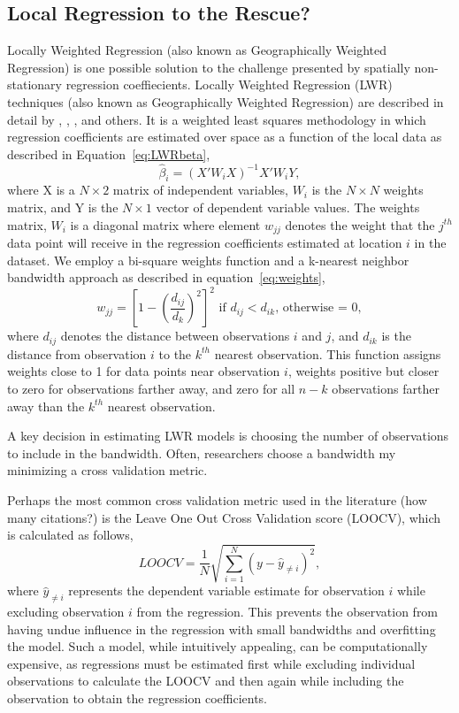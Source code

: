 \documentclass{article}\usepackage[]{graphicx}\usepackage[]{color}
\begin{document}
\subsection{Local Regression to the Rescue?}
Locally Weighted Regression (also known as Geographically Weighted Regression) is one possible solution to the challenge presented by spatially non-stationary regression coeffiecients. Locally Weighted Regression (LWR) techniques (also known as Geographically Weighted Regression) are described in detail by \citet{Cleveland1988}, \citet{Brunsdon1998b}, \citet{Fotheringham2002}, and others. It is a weighted least squares methodology in which regression coefficients are estimated over space as a function of the local data as described in Equation~\eqref{eq:LWRbeta},
\begin{equation}\label{eq:LWRbeta}
\hat{\beta}_i = (X'W_iX)^{-1}X'W_iY,
\end{equation}
where X is a $N \times 2$ matrix of independent variables, $W_i$ is the $N \times N$ weights matrix, and Y is the $N \times 1$ vector of dependent variable values. The weights matrix, $W_i$ is a diagonal matrix where element $w_{jj}$ denotes the weight that the $j^{th}$ data point will receive in the regression coefficients estimated at location $i$ in the dataset. We employ a bi-square weights function and a k-nearest neighbor bandwidth approach as described in equation~\eqref{eq:weights}, 
\begin{equation}\label{eq:weights}
w_{jj}=\left[1-\left(\frac{d_{ij}}{d_{k}}\right)^2 \right]^2 \textrm{ if  }d_{ij}<d_{ik}\textrm{, otherwise = 0},
\end{equation}
where $d_{ij}$ denotes the distance between observations $i$ and $j$, and $d_{ik}$ is the distance from observation $i$ to the $k^{th}$ nearest observation. This function assigns weights close to 1 for data points near observation $i$, weights positive but closer to zero for observations farther away, and zero for all $n-k$ observations farther away than the $k^{th}$ nearest observation. 

A key decision in estimating LWR models is choosing the number of observations to include in the bandwidth. Often, researchers choose a bandwidth my minimizing a cross validation metric. 

Perhaps the most common cross validation metric used in the literature (how many citations?) is the Leave One Out Cross Validation score (LOOCV), which is calculated as follows,
\begin{equation}\label{eq:LOOCV}
LOOCV = \frac{1}{N} \sqrt{\sum _{i = 1}^{N} (y - \hat{y}_{\neq i})^2},  
\end{equation}
where $\hat{y}_{\neq i}$ represents the dependent variable estimate for observation $i$ while excluding observation $i$ from the regression. This prevents the observation from having undue influence in the regression with small bandwidths and overfitting the model. Such a model, while intuitively appealing, can be computationally expensive, as regressions must be estimated first while excluding individual observations to calculate the LOOCV and then again while including the observation to obtain the regression coefficients.
\end{document}
